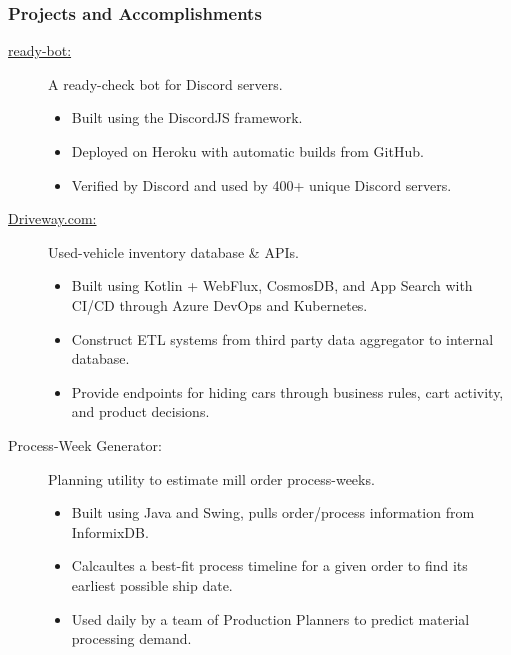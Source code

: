 \documentclass{article}
\begin{document}
\subsubsection*{Projects and Accomplishments}
    \begin{description}
        \item[\href{https://www.github.com/BurnsCommaLucas/ready-bot}{ready-bot:}] A ready-check bot for Discord servers.
            \begin{itemize}
                \item Built using the DiscordJS framework.
                \item Deployed on Heroku with automatic builds from GitHub.
                \item Verified by Discord and used by 400+ unique Discord servers.
            \end{itemize}

            \vspace{0.5em}

        \item[\href{https://driveway.com/shop}{Driveway.com:}] Used-vehicle inventory database \& APIs.
            \begin{itemize}
                \item Built using Kotlin + WebFlux, CosmosDB, and App Search with CI/CD through Azure DevOps and Kubernetes.
                \item Construct ETL systems from third party data aggregator to internal database.
                \item Provide endpoints for hiding cars through business rules, cart activity, and product decisions.
            \end{itemize}

            \vspace{0.5em}

        \item[Process-Week Generator:] Planning utility to estimate mill order process-weeks.
            \begin{itemize}
                \item Built using Java and Swing, pulls order/process information from InformixDB.
                \item Calcaultes a best-fit process timeline for a given order to find its earliest possible ship date.
                \item Used daily by a team of Production Planners to predict material processing demand.
            \end{itemize}


\end{description}
\end{document}
